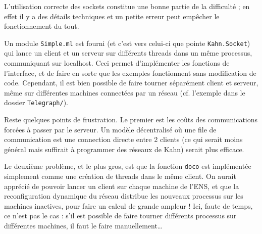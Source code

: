 \documentclass[a4paper, 11pt]{article}
\begin{document}
L'utilisation correcte des sockets constitue une bonne partie de la
difficulté ; en effet il y a des détails techniques et un petite
erreur peut empêcher le fonctionnement du tout.

Un module \texttt{Simple.ml} est fourni (et c'est vers celui-ci que
pointe \texttt{Kahn.Socket}) qui lance un client et un serveur sur
différents threads dans un même processus, communiquant sur
localhost. Ceci permet d'implémenter les fonctions de l'interface, et
de faire en sorte que les exemples fonctionnent sans modification de
code. Cependant, il est bien possible de faire tourner séparément
client et serveur, même sur différentes machines connectées par un
réseau (cf. l'exemple dans le dossier \texttt{Telegraph/}).

Reste quelques points de frustration. Le premier est les coûts des
communications forcées à passer par le serveur. Un modèle décentralisé
où une file de communication est une connection directe entre 2
clients (ce qui serait moins général mais suffirait à programmer des
réseaux de Kahn) serait plus efficace.

Le deuxième problème, et le plus gros, est que la fonction
\texttt{doco} est implémentée simplement comme une création de threads
dans le même client. On aurait apprécié de pouvoir lancer un client
sur chaque machine de l'ENS, et que la reconfiguration dynamique du
réseau distribue les nouveaux processus sur les machines inactives,
pour faire un calcul de grande ampleur ! Ici, faute de temps, ce n'est
pas le cas : s'il est possible de faire tourner différents processus
sur différentes machines, il faut le faire manuellement\ldots 
\end{document}
